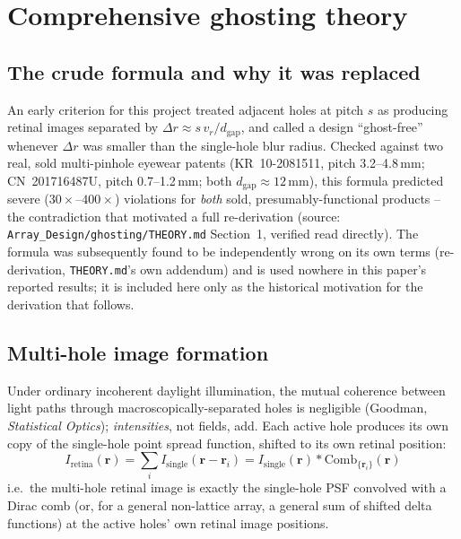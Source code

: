 \section{Comprehensive ghosting theory}
\label{sec:ghosting-theory}

\subsection{The crude formula and why it was replaced}
An early criterion for this project treated adjacent holes at pitch $s$ as producing
retinal images separated by $\Delta r \approx s\,v_r/d_{\mathrm{gap}}$, and called a
design ``ghost-free'' whenever $\Delta r$ was smaller than the single-hole blur radius.
Checked against two real, sold multi-pinhole eyewear patents (KR~10-2081511, pitch
3.2--4.8\,mm; CN~201716487U, pitch 0.7--1.2\,mm; both $d_{\mathrm{gap}}\approx12$\,mm),
this formula predicted severe ($30\times$--$400\times$) violations for \emph{both}
sold, presumably-functional products -- the contradiction that motivated a full
re-derivation (source: \texttt{Array\_Design/ghosting/THEORY.md} Section~1, verified
read directly). The formula was subsequently found to be independently wrong on its own
terms (re-derivation, \texttt{THEORY.md}'s own addendum) and is used nowhere in this
paper's reported results; it is included here only as the historical motivation for the
derivation that follows.

\subsection{Multi-hole image formation}
Under ordinary incoherent daylight illumination, the mutual coherence between light
paths through macroscopically-separated holes is negligible (Goodman,
\emph{Statistical Optics}); \emph{intensities}, not fields, add. Each active hole
produces its own copy of the single-hole point spread function, shifted to its own
retinal position:
\begin{equation}
I_{\mathrm{retina}}(\mathbf{r}) = \sum_i I_{\mathrm{single}}(\mathbf{r}-\mathbf{r}_i)
= I_{\mathrm{single}}(\mathbf{r}) * \mathrm{Comb}_{\{\mathbf{r}_i\}}(\mathbf{r})
\label{eq:comb}
\end{equation}
i.e.\ the multi-hole retinal image is exactly the single-hole PSF convolved with a Dirac
comb (or, for a general non-lattice array, a general sum of shifted delta functions) at
the active holes' own retinal image positions.

